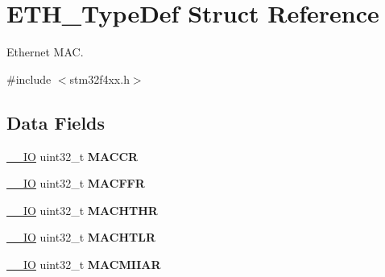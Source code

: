 \hypertarget{struct_e_t_h___type_def}{}\section{E\+T\+H\+\_\+\+Type\+Def Struct Reference}
\label{struct_e_t_h___type_def}


Ethernet M\+AC.  




{\ttfamily \#include $<$stm32f4xx.\+h$>$}

\subsection*{Data Fields}
\begin{DoxyCompactItemize}
\item 
\mbox{\label{struct_e_t_h___type_def_a20acbcac1c35f66de94c9ff0e2ddc7b0}} 
\hyperlink{group___c_m_s_i_s__core__definitions_gaec43007d9998a0a0e01faede4133d6be}{\+\_\+\+\_\+\+IO} uint32\+\_\+t {\bfseries M\+A\+C\+CR}
\item 
\mbox{\label{struct_e_t_h___type_def_a8ad4e3dbde1518ecde5d979c2a89a76a}} 
\hyperlink{group___c_m_s_i_s__core__definitions_gaec43007d9998a0a0e01faede4133d6be}{\+\_\+\+\_\+\+IO} uint32\+\_\+t {\bfseries M\+A\+C\+F\+FR}
\item 
\mbox{\label{struct_e_t_h___type_def_a121212bdb227106df681d24e5d896a4e}} 
\hyperlink{group___c_m_s_i_s__core__definitions_gaec43007d9998a0a0e01faede4133d6be}{\+\_\+\+\_\+\+IO} uint32\+\_\+t {\bfseries M\+A\+C\+H\+T\+HR}
\item 
\mbox{\label{struct_e_t_h___type_def_a1d34ab8e5c2041c00ba9526b3958099d}} 
\hyperlink{group___c_m_s_i_s__core__definitions_gaec43007d9998a0a0e01faede4133d6be}{\+\_\+\+\_\+\+IO} uint32\+\_\+t {\bfseries M\+A\+C\+H\+T\+LR}
\item 
\mbox{\label{struct_e_t_h___type_def_a9ea1e1c6615eb3bd70eb328dba65fc87}} 
\hyperlink{group___c_m_s_i_s__core__definitions_gaec43007d9998a0a0e01faede4133d6be}{\+\_\+\+\_\+\+IO} uint32\+\_\+t {\bfseries M\+A\+C\+M\+I\+I\+AR}
\item 
\mbox{\label{struct_e_t_h___type_def_a87c7687c35332bf5ee86473043652146}} 

\end{DoxyCompactItemize}
